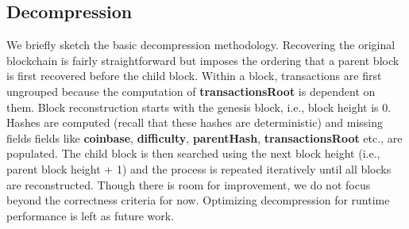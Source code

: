 \subsection{Decompression}
We briefly sketch the basic decompression methodology. 
Recovering the original blockchain is fairly straightforward but imposes the ordering that a parent block is first recovered before the child block.
Within a block, transactions are first ungrouped because the computation of \textbf{transactionsRoot} is dependent on them.
Block reconstruction starts with the genesis block, i.e., block height is 0. 
Hashes are computed (recall that these hashes are deterministic) and missing fields
fields like \textbf{coinbase}, \textbf{difficulty}, \textbf{parentHash}, \textbf{transactionsRoot} etc., are populated. 
The child block is then searched using the next block height (i.e., parent block height + 1)
and the process is repeated iteratively until all blocks are reconstructed.
Though there is room for improvement, we do not focus beyond the correctness criteria for now.
Optimizing decompression for runtime performance is left as future work.

